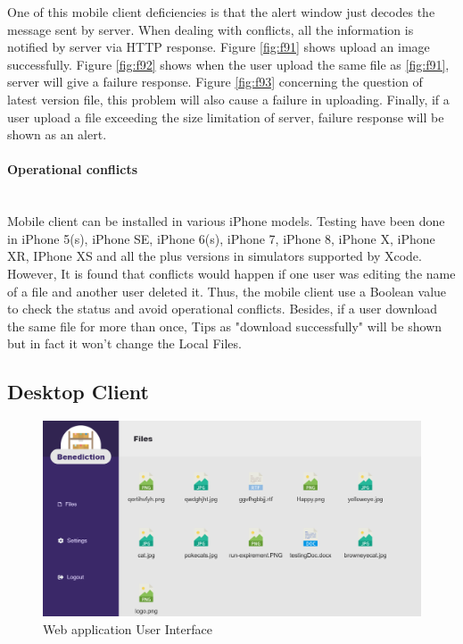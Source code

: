 \documentclass{article}
\begin{document}
One of this mobile client deficiencies is that the alert window just decodes the message sent by server. When dealing with conflicts, all the information is notified by server via HTTP response. Figure \ref{fig:f91} shows upload an image successfully. Figure \ref{fig:f92} shows when the user upload the same file as \ref{fig:f91}, server will give a failure response. Figure \ref{fig:f93} concerning the question of latest version file, this problem will also cause a failure in uploading. Finally, if a user upload a file exceeding the size limitation of server, failure response will be shown as an alert. 

\paragraph{Operational conflicts}\mbox{} \\

Mobile client can be installed in various iPhone models. Testing have been done in iPhone 5(s), iPhone SE, iPhone 6(s), iPhone 7, iPhone 8, iPhone X, iPhone XR, IPhone XS and all the plus versions in simulators supported by Xcode. However, It is found that conflicts would happen if one user was editing the name of a file and another user deleted it. Thus, the mobile client use a Boolean value to check the status and avoid operational conflicts. Besides, if a user download the same file for more than once, Tips as "download successfully" will be shown but in fact it won't change the Local Files.  


\subsection{Desktop Client}

\begin{figure}[H]
\begin{center}
\includegraphics[width=12cm]{webui.PNG}
\end{center}
\caption{Web application User Interface}\label{ex4}
\end{figure}
\end{document}
